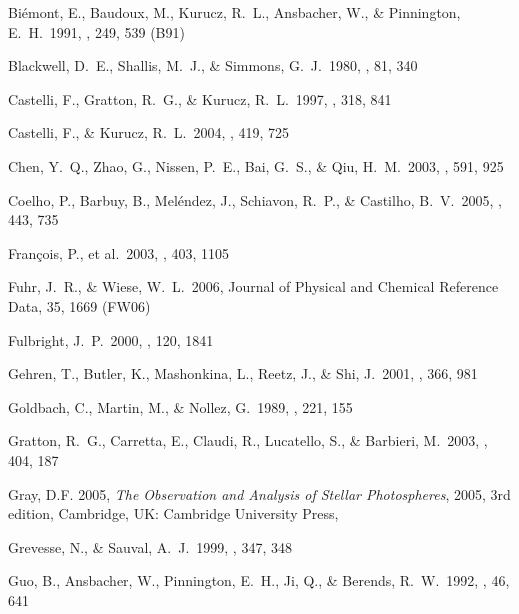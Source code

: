 \documentclass[traditabstract]{aa} %
\begin{document}
\begin{thebibliography}{}
 Bi\'emont, E., Baudoux, M., Kurucz, R.~L., Ansbacher, W., \& Pinnington, E.~H.\ 1991, \aap, 249, 539 (B91)

 Blackwell, D.~E., Shallis, M.~J., \& Simmons, G.~J.\ 1980, \aap, 81, 340 

 Castelli, F., Gratton, R.~G., \& Kurucz, R.~L.\ 1997, \aap, 318, 841 

 Castelli, F., \& Kurucz, R.~L.\ 2004, \aap, 419, 725 

 Chen, Y.~Q., Zhao, G., 
Nissen, P.~E., Bai, G.~S., \& Qiu, H.~M.\ 2003, \apj, 591, 925 

 Coelho, P., Barbuy, B., Mel{\'e}ndez, J., Schiavon, R.~P., \& Castilho, B.~V.\ 2005, \aap, 443, 735 

 Fran{\c c}ois, P., et al.\ 2003, \aap, 403, 1105 

 Fuhr, J.~R., \& Wiese, W.~L.\ 2006, Journal of Physical and Chemical Reference Data, 35, 1669 (FW06)

 Fulbright, J.~P.\ 2000, \aj, 
120, 1841 

 Gehren, T., Butler, K., Mashonkina, L., Reetz, J., \& Shi, J.\ 2001, \aap, 366, 981 

 Goldbach, C., Martin, M., \& Nollez, G.\ 1989, \aap, 221, 155 

 Gratton, R.~G., Carretta, E., Claudi, R., Lucatello, S., \& Barbieri, M.\ 2003, \aap, 404, 187 

\bibitem[]{} Gray, D.F. 2005, {\it The Observation and Analysis of Stellar Photospheres}, 2005,
3rd edition, Cambridge, UK: Cambridge University Press, 

 Grevesse, N., \& Sauval, A.~J.\ 1999, \aap, 347, 348 

 Guo, B., Ansbacher, W., 
Pinnington, E.~H., Ji, Q., \& Berends, R.~W.\ 1992, \pra, 46, 641 


\end{thebibliography}
\end{document}
